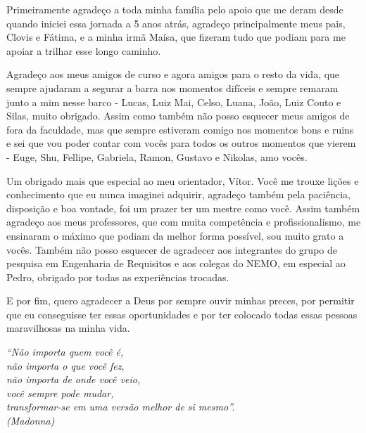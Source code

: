 \documentclass[
	12pt,				%
	openright,			%
	oneside,
	a4paper,			%
	english,			%
	french,				%
	spanish,			%
	brazil				%
	]{abntex2}
\begin{document}
\begin{agradecimentos}
Primeiramente agradeço a toda minha família pelo apoio que me deram desde quando iniciei essa jornada a 5 anos atrás, agradeço principalmente meus pais, Clovis e Fátima, e a minha irmã Maísa, que fizeram tudo que podiam para me apoiar a trilhar esse longo caminho. 

Agradeço aos meus amigos de curso e agora amigos para o resto da vida, que sempre ajudaram a segurar a barra nos momentos difíceis e sempre remaram junto a mim nesse barco - Lucas, Luiz Mai, Celso, Luana, João, Luiz Couto e Silas, muito obrigado. Assim como também não posso esquecer meus amigos de fora da faculdade, mas que sempre estiveram comigo nos momentos bons e ruins e sei que vou poder contar com vocês para todos os outros momentos que vierem - Euge, Shu, Fellipe, Gabriela, Ramon, Gustavo e Nikolas, amo vocês.

Um obrigado mais que especial ao meu orientador, Vítor. Você me trouxe lições e conhecimento que eu nunca imaginei adquirir, agradeço também pela paciência, disposição e boa vontade, foi um prazer ter um mestre como você. Assim também agradeço aos meus professores, que com muita competência e profissionalismo, me ensinaram o máximo que podiam da melhor forma possível, sou muito grato a vocês. Também não posso esquecer de agradecer aos integrantes do grupo de pesquisa em Engenharia de Requisitos e aos colegas do NEMO, em especial ao Pedro, obrigado por todas as experiências trocadas.

E por fim, quero agradecer a Deus por sempre ouvir minhas preces, por permitir que eu conseguisse ter essas oportunidades e por ter colocado todas essas pessoas maravilhosas na minha vida.


\end{agradecimentos}





\begin{epigrafe}
    \vspace*{\fill}
	\begin{flushright}
		\textit{``Não importa quem você é,\\
			não importa o que você fez,\\
			não importa de onde você veio, \\
			você sempre pode mudar, \\
			transformar-se em uma versão melhor de si mesmo''. \\
			(Madonna)\\ }
	\end{flushright}
\end{epigrafe}
\end{document}
